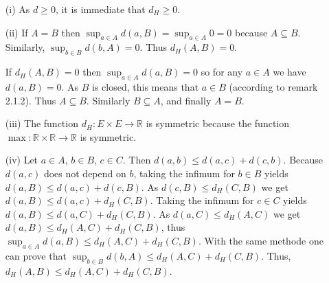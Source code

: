 \documentclass[11pt,a4paper]{article}
\newcommand{\R}{\mathbb{R}}
\newcommand{\1}{\mathbbm{1}}
\begin{document}
\begin{itemize}
\setlength\itemsep{-0.3em}
\item[(i)] As $d \geq 0$, it is immediate that $d_H \geq 0$.
\item[(ii)] If $A = B$ then $\sup_{a\in A} d(a,B) = \sup_{a \in A} 0 = 0$ because $A \subseteq B$. Similarly, $\sup_{b\in B} d(b,A) = 0$. Thus $d_H(A,B) = 0$.
\item[] If $d_H(A,B) = 0$ then $\sup_{a\in A} d(a,B) = 0$ so for any $a \in A$ we have $d(a,B) = 0$. As $B$ is closed, this means that $a \in B$ (according to remark 2.1.2). Thus $A \subseteq B$. Similarly $B \subseteq A$, and finally $A = B$.
\item[(iii)] The function $d_H : E \times E \to \R$ is symmetric because the function $\max : \R \times \R \to \R$ is symmetric.
\item[(iv)] Let $a \in A$, $b\in B$, $c\in C$. Then $d(a,b) \leq d(a,c) + d(c,b)$. Because $d(a,c)$ does not depend on $b$, taking the infimum for $b \in B$ yields $d(a,B) \leq d(a,c) + d(c,B)$. As $d(c,B) \leq d_H(C,B)$ we get $d(a,B) \leq d(a,c) + d_H(C,B)$. Taking the infimum for $c \in C$ yields $d(a,B) \leq d(a,C) + d_H(C,B)$. As $d(a,C) \leq d_H(A,C)$ we get $d(a,B) \leq d_H(A,C) + d_H(C,B)$, thus $\sup_{a\in A} d(a,B) \leq d_H(A,C) + d_H(C,B)$. With the same methode one can prove that $\sup_{b\in B} d(b,A) \leq d_H(A,C) + d_H(C,B)$. Thus, $d_H(A,B) \leq d_H(A,C) + d_H(C,B)$.
\end{itemize}
\newpage
\end{document}
